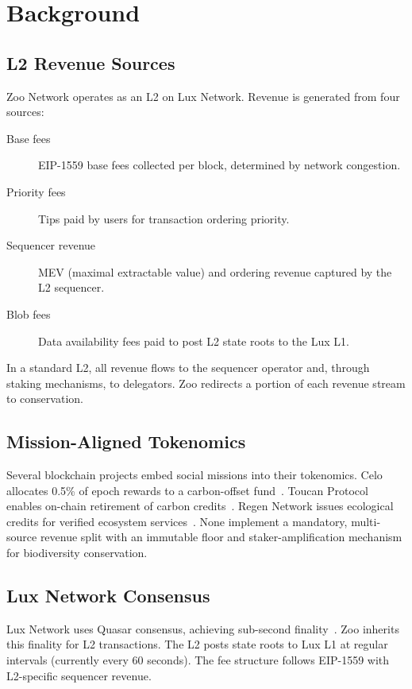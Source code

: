 \documentclass[11pt,letterpaper]{article}
\begin{document}
\section{Background}

\subsection{L2 Revenue Sources}

Zoo Network operates as an L2 on Lux Network. Revenue is generated from four sources:

\begin{description}
    \item[Base fees] EIP-1559 base fees collected per block, determined by network congestion.
    \item[Priority fees] Tips paid by users for transaction ordering priority.
    \item[Sequencer revenue] MEV (maximal extractable value) and ordering revenue captured by the L2 sequencer.
    \item[Blob fees] Data availability fees paid to post L2 state roots to the Lux L1.
\end{description}

In a standard L2, all revenue flows to the sequencer operator and, through staking mechanisms, to delegators. Zoo redirects a portion of each revenue stream to conservation.

\subsection{Mission-Aligned Tokenomics}

Several blockchain projects embed social missions into their tokenomics. Celo allocates 0.5\% of epoch rewards to a carbon-offset fund~\cite{celo2021}. Toucan Protocol enables on-chain retirement of carbon credits~\cite{toucan2022}. Regen Network issues ecological credits for verified ecosystem services~\cite{regen2021}. None implement a mandatory, multi-source revenue split with an immutable floor and staker-amplification mechanism for biodiversity conservation.

\subsection{Lux Network Consensus}

Lux Network uses Quasar consensus, achieving sub-second finality~\cite{luxquasar2024}. Zoo inherits this finality for L2 transactions. The L2 posts state roots to Lux L1 at regular intervals (currently every 60 seconds). The fee structure follows EIP-1559 with L2-specific sequencer revenue.
\end{document}
